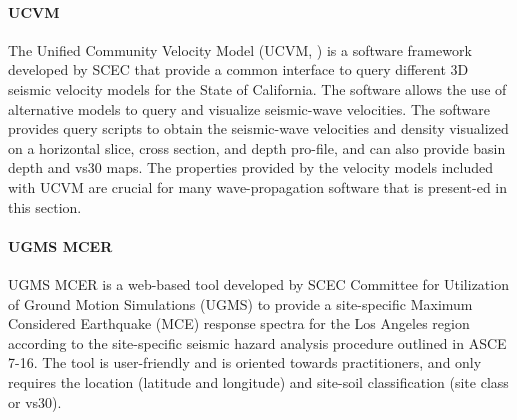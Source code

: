 \paragraph{UCVM} The Unified Community Velocity Model (UCVM, \cite{small2017scec}) is a software framework developed by SCEC that provide a common interface to query different 3D seismic velocity models for the State of California. The software allows the use of alternative models to query and visualize seismic-wave velocities. The software provides query scripts to obtain the seismic-wave velocities and density visualized on a horizontal slice, cross section, and depth pro-file, and can also provide basin depth and vs30 maps. The properties provided by the velocity models included with UCVM are crucial for many wave-propagation software that is present-ed in this section.

\paragraph{UGMS MCER} UGMS MCER \citep{crouse2018sitespecific} is a web-based tool developed by SCEC Committee for Utilization of Ground Motion Simulations (UGMS) to provide a site-specific Maximum Considered Earthquake (MCE) response spectra for the Los Angeles region according to the site-specific seismic hazard analysis procedure outlined in ASCE 7-16. The tool is user-friendly and is oriented towards practitioners, and only requires the location (latitude and longitude) and site-soil classification (site class or vs30).